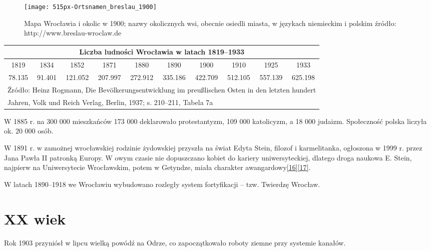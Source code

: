 \documentclass{article}
\begin{document}
\begin{figure}[ht]
\centering
\texttt{[image: 515px-Ortsnamen\_breslau\_1900]}
\caption{Mapa Wrocławia i okolic w 1900;
nazwy okolicznych wsi, obecnie osiedli miasta, w językach niemieckim i polskim
źródło: http://www.breslau-wroclaw.de}
\end{figure}

\begin {center} 
\begin{tabular}{|c|c|c|c|c|c|c|c|c|c|}
\hline
\multicolumn{10}{|c|}{Liczba ludności Wrocławia w latach 1819–1933}\\ 
\hline
1819 & 1834 & 1852 & 1871 & 1880 & 1890 & 1900 & 1910 & 1925 & 1933 \\
\hline
78.135 & 91.401 & 121.052 & 207.997 & 272.912 & 335.186 & 422.709 & 512.105 & 557.139 & 625.198\\
\hline
\multicolumn{10}{|l|}{Źródło: Heinz Rogmann, Die Bevölkerungsentwicklung im preußlischen Osten in den letzten hundert}\\
\multicolumn{10}{|l|}{Jahren, Volk und Reich Verlag, Berlin, 1937; s. 210–211, Tabela 7a}\\
\hline
\end {tabular}
\end {center}

\noindent W 1885 r. na 300 000 mieszkańców 173 000 deklarowało protestantyzm, 109 000 katolicyzm, a 18 000 judaizm. Społeczność polska liczyła ok. 20 000 osób.

\vspace{6pt}

\noindent W 1891 r. w zamożnej wrocławskiej rodzinie żydowskiej przyszła na świat Edyta Stein, filozof i karmelitanka, ogłoszona w 1999 r. przez Jana Pawła II patronką Europy. W owym czasie nie dopuszczano kobiet do kariery uniwersyteckiej, dlatego droga naukowa E. Stein, najpierw na Uniwersytecie Wrocławskim, potem w Getyndze, miała charakter awangardowy\hyperref[16]{[16]}\label{116}\hyperref[17]{[17]}\label{117}.

\vspace{6pt}

\noindent W latach 1890–1918 we Wrocławiu wybudowano rozległy system fortyfikacji – tzw. Twierdzę Wrocław.

\section*{XX wiek}
Rok 1903 przyniósł w lipcu wielką powódź na Odrze, co zapoczątkowało roboty ziemne przy systemie kanałów.
\end{document}
